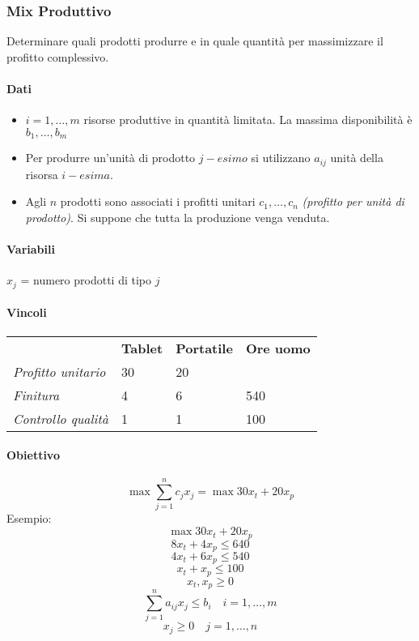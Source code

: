 \documentclass[12pt, letterpaper]{article}
\newcommand{\problema}[5]{
	#1
	\begin{dati}
		\paragraph{Dati} #2
	\end{dati}
	\begin{variabili}
		\paragraph{Variabili} #3
	\end{variabili}
	\begin{vincoli}
		\paragraph{Vincoli} #4
	\end{vincoli}
	\begin{obiettivo}
		\paragraph{Obiettivo} #5
	\end{obiettivo}
}
\begin{document}
		\subsubsection{Mix Produttivo}
			\problema
				{
				Determinare quali prodotti produrre e in quale quantità per massimizzare il profitto complessivo.
				}
				{\begin{itemize}
					\item $i=1, \dots, m$ risorse produttive in quantità limitata. La massima disponibilità è $b_1, \dots, b_m$
					\item Per produrre un'unità di prodotto $j-esimo$ si utilizzano $a_{ij}$ unità della risorsa $i-esima$.
					\item Agli $n$ prodotti sono associati i profitti unitari $c_1, \dots, c_n$ \textit{(profitto per unità di prodotto)}. Si suppone che tutta la produzione venga venduta.
				\end{itemize}}
				{$x_j$ = numero prodotti di tipo $j$}
				{\begin{center}
					\begin{tabular}{llll}
						 & \textbf{Tablet} & \textbf{Portatile} & \textbf{Ore uomo}\\
						 \textit{Profitto unitario} & 30 & 20 &  \\
						 \textit{Finitura} & 4 & 6 & 540\\
						 \textit{Controllo qualità} & 1 & 1 & 100
					\end{tabular}
				\end{center}}
				{$$\max \sum_{j=1}^n c_j x_j = \max 30x_t + 20 x_p$$
				Esempio: $$\max 30x_t + 20x_p$$ 
				$$8x_t + 4x_p \leq 640 $$
				$$4x_t + 6x_p \leq 540$$
				$$x_t + x_p \leq 100$$
				$$x_t, x_p \geq 0$$
				$$\sum_{j=1}^n a_{ij}x_j \leq b_i \quad i=1,\dots,m$$
				$$x_j \geq 0 \quad j=1,\dots,n$$
				}
\end{document}
